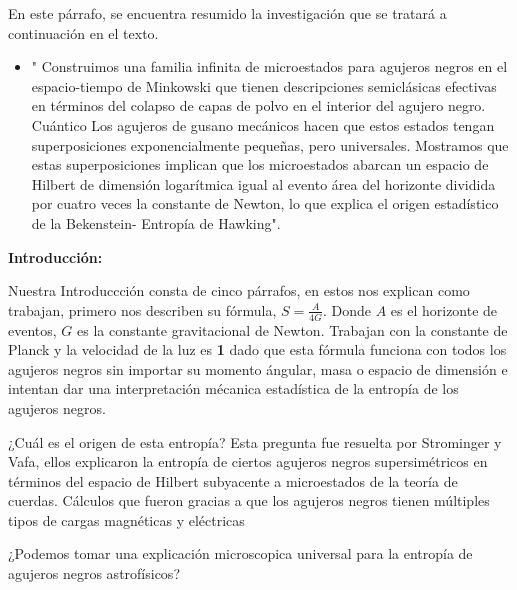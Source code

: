 \documentclass[letterpaper]{article}
\begin{document}
\begin{justify}
En este párrafo, se encuentra resumido la investigación que se tratará a 
continuación en el texto. 
\end{justify}
\begin{itemize}
    \item " \(\)Construimos una familia infinita de microestados para agujeros negros en el espacio-tiempo de Minkowski que tienen
    descripciones semiclásicas efectivas en términos del colapso de capas de polvo en el interior del agujero negro. Cuántico
    Los agujeros de gusano mecánicos hacen que estos estados tengan superposiciones exponencialmente pequeñas, pero universales. Mostramos
    que estas superposiciones implican que los microestados abarcan un espacio de Hilbert de dimensión logarítmica igual al evento
    área del horizonte dividida por cuatro veces la constante de Newton, lo que explica el origen estadístico de la Bekenstein-
    Entropía de Hawking".
\end{itemize}
\vspace{\baselineskip}

\begin{justify}
\textbf{Introducción:}
\end{justify}

\begin{justify}
Nuestra Introduccción consta de cinco párrafos, en estos nos explican como trabajan, primero nos describen su fórmula,
\( S= \frac{A}{4G} \). Donde \(A\) es el horizonte de eventos, \(G\) es la constante
gravitacional de Newton. Trabajan con la constante de Planck y la velocidad de la luz es \textbf{1} dado que esta
fórmula funciona con todos los agujeros negros sin importar su momento ángular, masa o espacio de dimensión e intentan
dar una interpretación mécanica estadística de la entropía de los agujeros negros.
\end{justify}
\begin{justify}
¿Cuál es el origen de esta entropía? Esta pregunta fue resuelta por Strominger y Vafa, ellos explicaron la entropía de 
ciertos agujeros negros supersimétricos en términos del espacio de Hilbert subyacente a microestados de la teoría de cuerdas. 
Cálculos que fueron gracias a que los agujeros negros tienen múltiples tipos de cargas magnéticas y eléctricas
\end{justify}
\begin{justify}
¿Podemos tomar una explicación microscopica universal para la entropía de agujeros negros astrofísicos?
\end{justify}
\end{document}

